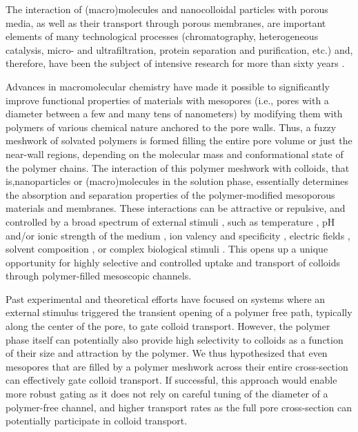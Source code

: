 \documentclass[12pt, a4paper]{article}
\begin{document}
The interaction of (macro)molecules and nanocolloidal particles with porous media, as well as their transport through porous membranes, are important elements of many technological processes (chromatography, heterogeneous catalysis, micro- and ultrafiltration, protein separation and purification, etc.) and, therefore, have been the subject of intensive research for more than sixty years \cite{Watson1959, Rout2003, Huang2023, Uredat2024}.

Advances in macromolecular chemistry have made it possible to significantly improve functional properties of materials with mesopores (i.e., pores with a diameter between a few and many tens of nanometers) by modifying them with polymers of various chemical nature anchored to  the pore walls.
Thus, a fuzzy meshwork of solvated polymers is formed filling the entire pore volume or just the near-wall regions, depending on the molecular mass and conformational state of the polymer chains.
The interaction of this polymer meshwork with colloids, that is,nanoparticles or (macro)molecules in the solution phase, essentially determines the absorption and separation properties of the polymer-modified mesoporous materials and membranes.
These interactions can be attractive or repulsive, and controlled by a broad spectrum of external stimuli \cite{Jeong2002, Lee2010, Low2019}, 
such as temperature                     \cite{Stetsyshyn2020}, 
pH and/or ionic strength of the medium  \cite{Dai2008, Zhang2005}, 
ion valency and specificity             \cite{Zhulina1999, Robertson2021},
electric fields                         \cite{Lokuge2005}, 
solvent composition                     \cite{Halperin2011, Darabi2016}, 
or complex biological stimuli           \cite{Ikeda2010, Lu2003}.
This opens up a unique opportunity for highly selective and controlled uptake and transport of colloids through polymer-filled mesoscopic channels.

Past experimental and theoretical efforts have focused on systems where an external stimulus triggered the transient opening of a polymer free path, typically along the center of the pore, to gate colloid transport.
However, the polymer phase itself can potentially also provide high selectivity to colloids as a function of their size and attraction by the polymer.
We thus hypothesized that even mesopores that are filled by a polymer meshwork across their entire cross-section can effectively gate colloid transport.
If successful, this approach would enable more robust gating as it does not rely on careful tuning of the diameter of a polymer-free channel, and higher transport rates as the full pore cross-section can potentially participate in colloid transport.
\end{document}

